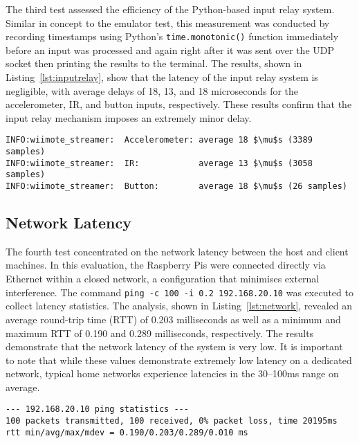 The third test assessed the efficiency of the Python-based input relay
system. Similar in concept to the emulator test, this measurement was conducted
by recording timestamps using Python’s \texttt{time.monotonic()} function immediately
before an input was processed and again right after it was sent over the UDP
socket then printing the results to the terminal. The results, shown in
Listing~\ref{lst:inputrelay}, show that the latency of the input relay system is
negligible, with average delays of 18, 13, and 18 microseconds for the
accelerometer, IR, and button inputs, respectively. These results confirm that the input
relay mechanism imposes an extremely minor delay.

\begin{lstlisting}[caption={Input Relay System Latency Results}, label=lst:inputrelay, mathescape=true]
INFO:wiimote_streamer:  Accelerometer: average 18 $\mu$s (3389 samples)
INFO:wiimote_streamer:  IR:            average 13 $\mu$s (3058 samples)
INFO:wiimote_streamer:  Button:        average 18 $\mu$s (26 samples)
\end{lstlisting}

\subsection{Network Latency}

The fourth test concentrated on the network latency between the host and client
machines. In this evaluation, the Raspberry Pis were connected directly via
Ethernet within a closed network, a configuration that minimises external
interference. The command \texttt{ping -c 100 -i 0.2 192.168.20.10} was executed to
collect latency statistics. The analysis, shown in Listing~\ref{lst:network},
revealed an average round-trip time (RTT) of 0.203 milliseconds as well as a
minimum and maximum RTT of 0.190 and 0.289 milliseconds, respectively. The results
demonstrate that the network latency of the system is very low. It is important to note that while these values demonstrate extremely low latency on a
dedicated network, typical home networks experience latencies in
the 30–100ms range on average\cite{latencySurvey}.

\begin{lstlisting}[caption={Network Latency Results}, label=lst:network]
--- 192.168.20.10 ping statistics ---
100 packets transmitted, 100 received, 0% packet loss, time 20195ms
rtt min/avg/max/mdev = 0.190/0.203/0.289/0.010 ms
\end{lstlisting}



